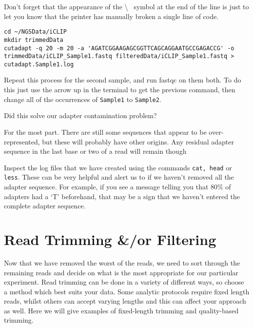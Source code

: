 \begin{warning}
Don't forget that the appearance of the \textbackslash ~ symbol at the end of the line is just to let you know that the printer has manually broken a single line of code.
\end{warning}

\begin{steps}
\begin{minipage}{\textwidth}
\begin{lstlisting}
cd ~/NGSData/iCLIP
mkdir trimmedData
cutadapt -q 20 -m 20 -a 'AGATCGGAAGAGCGGTTCAGCAGGAATGCCGAGACCG' -o trimmedData/iCLIP_Sample1.fastq filteredData/iCLIP_Sample1.fastq > cutadapt.Sample1.log
\end{lstlisting}
\end{minipage}
\end{steps}

\begin{steps}
Repeat this process for the second sample, and run fastqc on them both.
To do this just use the arrow up in the terminal to get the previous command, then change all of the occurrences of \texttt{Sample1} to \texttt{Sample2}.
\end{steps}

\begin{questions}
Did this solve our adapter contamination problem?\\
\begin{answer}
For the most part.
There are still some sequences that appear to be over-represented, but these will probably have other origins.
Any residual adapter sequence in the last base or two of a read will remain though
\end{answer}
\end{questions}

\begin{steps}
Inspect the log files that we have created using the commands \texttt{cat, head} or \texttt{less}.
These can be very helpful and alert us to if we haven't removed all the adapter sequence.
For example, if you see a message telling you that 80\% of adapters had a `T' beforehand, that may be a sign that we haven't entered the complete adapter sequence.
\end{steps}



\section{Read Trimming \&/or Filtering}
Now that we have removed the worst of the reads, we need to sort through the remaining reads and decide on what is the most appropriate for our particular experiment.
Read trimming can be done in a variety of different ways, so choose a method which best suits your data. 
Some analytic protocols require fixed length reads, whilst others can accept varying lengths and this can affect your approach as well.
Here we will give examples of fixed-length trimming and quality-based trimming.


